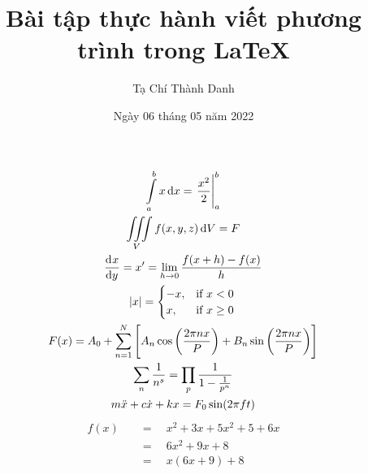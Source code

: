 \documentclass[a4paper,12pt,notitlepage]{article}
\author{Tạ Chí Thành Danh}
\date{Ngày 06 tháng 05 năm 2022}
\title{Bài tập thực hành viết phương trình trong \LaTeX}
\begin{document}
\begin{gather*}
	\int\limits_{a}^{b} x\dif x = \left.\dfrac{x^2}{2}\right|_a^b \\
	\iiint\limits_V f(x,y,z) \dif V = F \\
	\dod{x}{y} = x^\prime = \lim_{h \to 0} \dfrac{f(x+h)-f(x)}{h} \\
	\envert{x} = 
	\begin{cases}
		-x, & \text{if } x<0 \\
		x, & \text{if } x \geq 0
	\end{cases} \\
	F(x) = A_0 + \sum_{n=1}^N \intcc{A_n \cos \intoo{\dfrac{2\pi nx}{P}} + B_n \sin \intoo{\dfrac{2\pi nx}{P}}} \\
	\sum_n \dfrac{1}{n^s} = \prod_{p} \dfrac{1}{1-\tfrac{1}{p^n}} \\
	m\ddot{x} + c\dot{x} + kx = F_0\sin(2\pi ft)
\end{gather*}
\begin{align*}
	f(x) \quad &= \quad x^2 + 3x + 5x^2 + 5 + 6x \\
	&= \quad 6x^2 + 9x + 8 \\
	&= \quad x(6x+9) + 8 
\end{align*}
\end{document}
